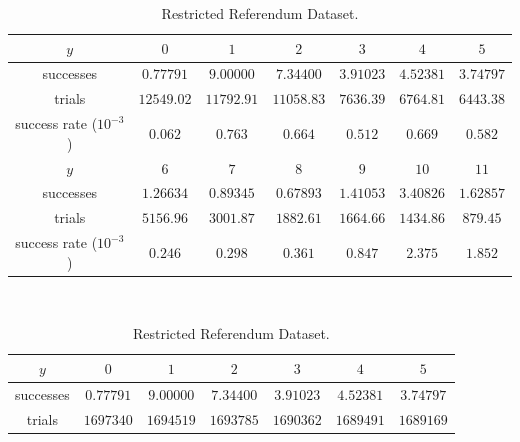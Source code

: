 \documentclass[times, utf8, zavrsni]{fer}
\begin{document}
\begin{table}[htp]    
\small
\begin{subtable}{\textwidth}
\centering
\begin{tabular}{|c|c|c|c|c|c|c|}
 \hline 
 \rule[-1ex]{0pt}{2.5ex} $y$ & $0$ & $1$ & $2$ & $3$ & $4$ & $5$  \\ 
 \hline 
 \rule[-1ex]{0pt}{2.5ex} successes & $0.77791$ & $9.00000$ & $7.34400$ & $3.91023$ & $4.52381$ & $3.74797$  \\ 
 \hline 
 \rule[-1ex]{0pt}{2.5ex} trials & $12549.02$ & $11792.91$ & $11058.83$ & $7636.39$ & $6764.81$ & $6443.38$ \\ 
 \hline 
 \rule[-1ex]{0pt}{2.5ex} success rate ($10 ^ {-3}$)& $0.062$ & $0.763$ & $0.664$ & $0.512$ & $0.669$ & $0.582$  \\ 
 \hline 
  \hline 
 \rule[-1ex]{0pt}{2.5ex} $y$ & $6$ & $7$ & $8$ & $9$ & $10$ & $11$ \\ 
 \hline 
 \rule[-1ex]{0pt}{2.5ex} successes & $ 1.26634$ & $0.89345$ & $0.67893$ & $1.41053$ & $3.40826$ & $1.62857$ \\ 
 \hline 
 \rule[-1ex]{0pt}{2.5ex} trials & $5156.96$ & $3001.87$ & $1882.61$ & $1664.66$ & $1434.86$ & $879.45$ \\ 
 \hline 
 \rule[-1ex]{0pt}{2.5ex} success rate ($10 ^ {-3}$)& $0.246$ & $0.298$ & $0.361$ & $0.847$ & $2.375$ & $1.852$ \\ 
 \hline 
 \end{tabular}  
  \caption{Restricted Referendum Dataset.}
  \label{T1}
 \end{subtable}
\\[1ex]
\begin{subtable}{\textwidth}
\centering
\begin{tabular}{|c|c|c|c|c|c|c|}
 \hline 
 \rule[-1ex]{0pt}{2.5ex} $y$ & $0$ & $1$ & $2$ & $3$ & $4$ & $5$  \\ 
 \hline 
 \rule[-1ex]{0pt}{2.5ex} successes & $0.77791$ & $9.00000$ & $7.34400$ & $3.91023$ & $4.52381$ & $3.74797$  \\ 
 \hline 
 \rule[-1ex]{0pt}{2.5ex} trials & $1697340$ & $1694519$ & $1693785$ & $1690362$ & $1689491$ & $1689169$ \\ 

\end{tabular}
\end{subtable}
\end{table}
\end{document}

